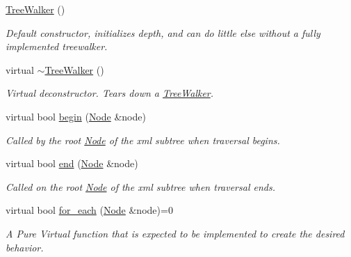 \begin{DoxyCompactItemize}
\item 
\hypertarget{classMezzanine_1_1xml_1_1TreeWalker_a2d224f99cc3c583ba2fb0b9be4c4afd2}{
\hyperlink{classMezzanine_1_1xml_1_1TreeWalker_a2d224f99cc3c583ba2fb0b9be4c4afd2}{TreeWalker} ()}
\label{classMezzanine_1_1xml_1_1TreeWalker_a2d224f99cc3c583ba2fb0b9be4c4afd2}

\begin{DoxyCompactList}\small\item\em Default constructor, initializes depth, and can do little else without a fully implemented treewalker. \item\end{DoxyCompactList}\item 
\hypertarget{classMezzanine_1_1xml_1_1TreeWalker_a6763c7f7fa1e79d5282275c2386673e2}{
virtual \hyperlink{classMezzanine_1_1xml_1_1TreeWalker_a6763c7f7fa1e79d5282275c2386673e2}{$\sim$TreeWalker} ()}
\label{classMezzanine_1_1xml_1_1TreeWalker_a6763c7f7fa1e79d5282275c2386673e2}

\begin{DoxyCompactList}\small\item\em Virtual deconstructor. Tears down a \hyperlink{classMezzanine_1_1xml_1_1TreeWalker}{TreeWalker}. \item\end{DoxyCompactList}\item 
virtual bool \hyperlink{classMezzanine_1_1xml_1_1TreeWalker_a46997327b1578f172e84e0bd9e283680}{begin} (\hyperlink{classMezzanine_1_1xml_1_1Node}{Node} \&node)
\begin{DoxyCompactList}\small\item\em Called by the root \hyperlink{classMezzanine_1_1xml_1_1Node}{Node} of the xml subtree when traversal begins. \item\end{DoxyCompactList}\item 
virtual bool \hyperlink{classMezzanine_1_1xml_1_1TreeWalker_a0d37b0282278bc6bc5ecd981221cade0}{end} (\hyperlink{classMezzanine_1_1xml_1_1Node}{Node} \&node)
\begin{DoxyCompactList}\small\item\em Called on the root \hyperlink{classMezzanine_1_1xml_1_1Node}{Node} of the xml subtree when traversal ends. \item\end{DoxyCompactList}\item 
virtual bool \hyperlink{classMezzanine_1_1xml_1_1TreeWalker_a04b563afcbeaa53cbea336b837052ef3}{for\_\-each} (\hyperlink{classMezzanine_1_1xml_1_1Node}{Node} \&node)=0
\begin{DoxyCompactList}\small\item\em A Pure Virtual function that is expected to be implemented to create the desired behavior. \item\end{DoxyCompactList}\end{DoxyCompactItemize}
